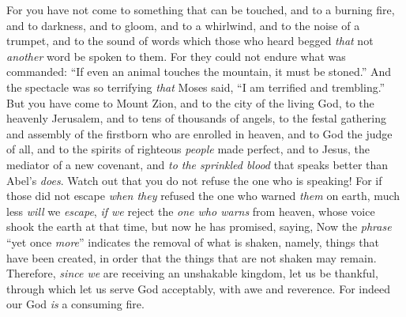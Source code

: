 \begin{biblechapter}
\verse For you have not come to something that can be touched, and to a burning fire, and to darkness, and to gloom, and to a whirlwind,
\verse and to the noise of a trumpet, and to the sound of words which those who heard begged \textit{that} not \textit{another} word be spoken to them.
\verse For they could not endure what was commanded: “If even an animal touches the mountain, it must be stoned.”
\verse And the spectacle was so terrifying \textit{that} Moses said, “I am terrified and trembling.”
\verse But you have come to Mount Zion, and to the city of the living God, to the heavenly Jerusalem, and to tens of thousands of angels, to the festal gathering
\verse and assembly of the firstborn who are enrolled in heaven, and to God the judge of all, and to the spirits of righteous \textit{people} made perfect,
\verse and to Jesus, the mediator of a new covenant, and \textit{to the sprinkled blood} that speaks better than Abel’s \textit{does}.
\verse Watch out that you do not refuse the one who is speaking! For if those did not escape \textit{when they} refused the one who warned \textit{them} on earth, much less \textit{will} we \textit{escape}, \textit{if we} reject the \textit{one who warns} from heaven,
\verse whose voice shook the earth at that time, but now he has promised, saying,
\verse Now the \textit{phrase} “yet once \textit{more}” indicates the removal of what is shaken, namely, things that have been created, in order that the things that are not shaken may remain.
\verse Therefore, \textit{since we} are receiving an unshakable kingdom, let us be thankful, through which let us serve God acceptably, with awe and reverence.
\verse For indeed our God \textit{is} a consuming fire.
\end{biblechapter}

